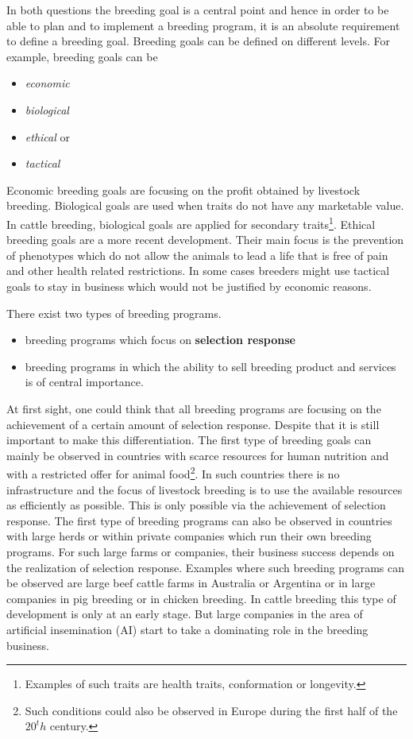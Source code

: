 \documentclass[
]{book}
\providecommand{\tightlist}{%
  \setlength{\itemsep}{0pt}\setlength{\parskip}{0pt}}
\begin{document}
In both questions the breeding goal is a central point and hence in order to be able to plan and to implement a breeding program, it is an absolute requirement to define a breeding goal. Breeding goals can be defined on different levels. For example, breeding goals can be

\begin{itemize}
\tightlist
\item
  \emph{economic}
\item
  \emph{biological}
\item
  \emph{ethical} or
\item
  \emph{tactical}
\end{itemize}

Economic breeding goals are focusing on the profit obtained by livestock breeding. Biological goals are used when traits do not have any marketable value. In cattle breeding, biological goals are applied for secondary traits\footnote{Examples of such traits are health traits, conformation or longevity.}. Ethical breeding goals are a more recent development. Their main focus is the prevention of phenotypes which do not allow the animals to lead a life that is free of pain and other health related restrictions. In some cases breeders might use tactical goals to stay in business which would not be justified by economic reasons.

There exist two types of breeding programs.

\begin{itemize}
\tightlist
\item
  breeding programs which focus on \textbf{selection response}
\item
  breeding programs in which the ability to sell breeding product and services is of central importance.
\end{itemize}

At first sight, one could think that all breeding programs are focusing on the achievement of a certain amount of selection response. Despite that it is still important to make this differentiation. The first type of breeding goals can mainly be observed in countries with scarce resources for human nutrition and with a restricted offer for animal food\footnote{Such conditions could also be observed in Europe during the first half of the \(20^th\) century.}. In such countries there is no infrastructure and the focus of livestock breeding is to use the available resources as efficiently as possible. This is only possible via the achievement of selection response. The first type of breeding programs can also be observed in countries with large herds or within private companies which run their own breeding programs. For such large farms or companies, their business success depends on the realization of selection response. Examples where such breeding programs can be observed are large beef cattle farms in Australia or Argentina or in large companies in pig breeding or in chicken breeding. In cattle breeding this type of development is only at an early stage. But large companies in the area of artificial insemination (AI) start to take a dominating role in the breeding business.
\end{document}
